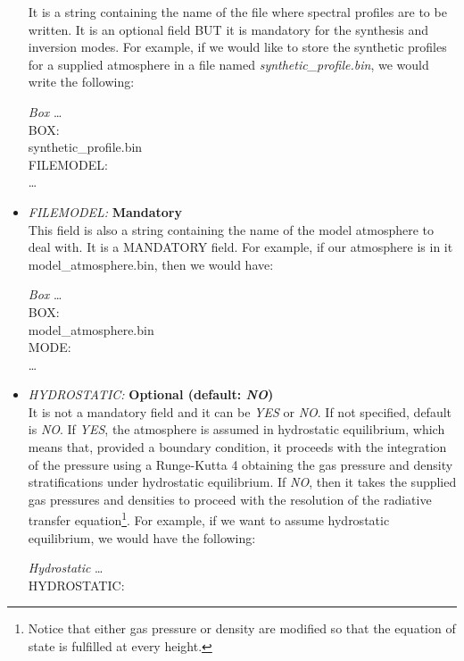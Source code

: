\begin{itemize}
  It is a string containing the name of the file where spectral profiles are to be written. It is an optional field BUT it is mandatory for the synthesis and inversion modes. For example, if we would like to store the synthetic profiles for a supplied atmosphere in a file named {\it synthetic\_profile.bin}, we would write the following:\\
\begin{ifbox}[label={tb:box}]{{\it Box}}
  \scriptsize
  \ldots\\
  BOX:\\
  synthetic\_profile.bin\\
  FILEMODEL:\\
  \ldots
  \normalsize
\end{ifbox}
  \item {\it FILEMODEL:} {\bf Mandatory}\\
  This field is also a string containing the name of the model atmosphere to deal with. It is a MANDATORY field. For example, if our atmosphere is in {it model\_atmosphere.bin}, then we would have:\\
\begin{ifbox}[label={tb:box}]{{\it Box}}
  \scriptsize
  \ldots\\
  BOX:\\
  model\_atmosphere.bin\\
  MODE:\\
  \ldots
  \normalsize
\end{ifbox}
  \item {\it HYDROSTATIC:} {\bf Optional (default: {\it NO})}\\
  It is not a mandatory field and it can be {\it YES} or {\it NO}. If not specified, default is {\it NO}. If {\it YES}, the atmosphere is assumed in hydrostatic equilibrium, which means that, provided a boundary condition, it proceeds with the integration of the pressure using a Runge-Kutta 4 obtaining the gas pressure and density stratifications under hydrostatic equilibrium. If {\it NO}, then it takes the supplied gas pressures and densities to proceed with the resolution of the radiative transfer equation\footnote{Notice that either gas pressure or density are modified so that the equation of state is fulfilled at every height.}. For example, if we want to assume hydrostatic equilibrium, we would have the following:\\
\begin{ifbox}[label={tb:hydrostatic}]{{\it Hydrostatic}}
  \scriptsize
  \ldots\\
  HYDROSTATIC:\\

\end{ifbox}
\end{itemize}
